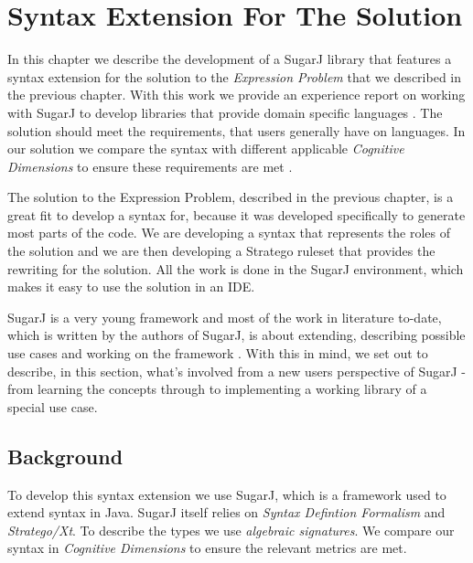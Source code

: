 \documentclass{report}
\begin{document}





\chapter{Syntax Extension For The Solution}

\label{chapterOurSolutionSyntaxExtension}

In this chapter we describe the development of a SugarJ library that features a syntax extension for the solution to the \emph{Expression Problem} that we described in the previous chapter. With this work we provide an experience report on working with SugarJ to develop libraries that provide domain specific languages \cite{Erdweg-SugarJ-2011}. The solution should meet the requirements, that users generally have on languages. In our solution we compare the syntax with different applicable \emph{Cognitive Dimensions} to ensure these requirements are met \cite{Green-Cognitive-1996}.

The solution to the Expression Problem, described in the previous chapter, is a great fit to develop a syntax for, because it was developed specifically to generate most parts of the code. We are developing a syntax that represents the roles of the solution and we are then developing a Stratego ruleset that provides the rewriting for the solution. All the work is done in the SugarJ environment, which makes it easy to use the solution in an IDE.

SugarJ is a very young framework and most of the work in literature to-date, which is written by the authors of SugarJ, is about extending, describing possible use cases and working on the framework \cite{Fehrenbach-Retrofitting-2011, Erdweg-Composition-2012, Erdweg-Editor-2011, Erdweg-SugarHaskell-2012, Erdweg-Questionnaire-2013}. With this in mind, we set out to describe, in this section, what’s involved from a new users perspective of SugarJ - from learning the concepts through to implementing a working library of a special use case.

\section{Background}

To develop this syntax extension we use SugarJ, which is a framework used to extend syntax in Java. SugarJ itself relies on \emph{Syntax Defintion Formalism} and \emph{Stratego/Xt}. To describe the types we use \emph{algebraic signatures}. We compare our syntax in \emph{Cognitive Dimensions} to ensure the relevant metrics are met.
\end{document}
